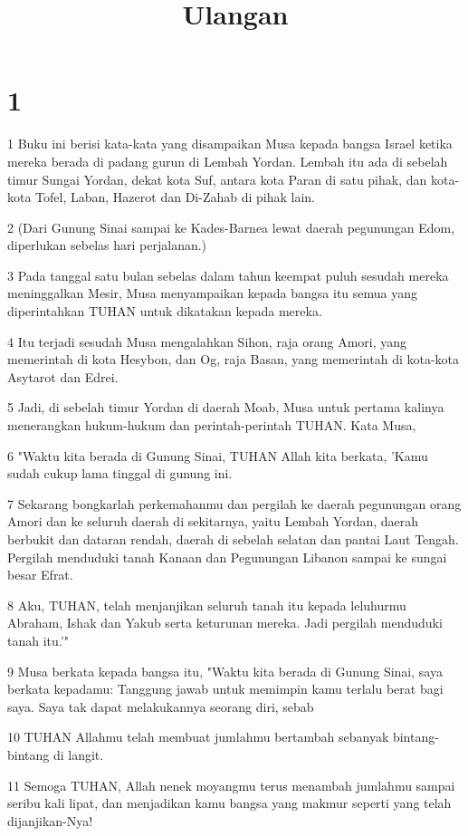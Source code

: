 

\title{Ulangan}


\chapter{1}

\par 1 Buku ini berisi kata-kata yang disampaikan Musa kepada bangsa Israel ketika mereka berada di padang gurun di Lembah Yordan. Lembah itu ada di sebelah timur Sungai Yordan, dekat kota Suf, antara kota Paran di satu pihak, dan kota-kota Tofel, Laban, Hazerot dan Di-Zahab di pihak lain.
\par 2 (Dari Gunung Sinai sampai ke Kades-Barnea lewat daerah pegunungan Edom, diperlukan sebelas hari perjalanan.)
\par 3 Pada tanggal satu bulan sebelas dalam tahun keempat puluh sesudah mereka meninggalkan Mesir, Musa menyampaikan kepada bangsa itu semua yang diperintahkan TUHAN untuk dikatakan kepada mereka.
\par 4 Itu terjadi sesudah Musa mengalahkan Sihon, raja orang Amori, yang memerintah di kota Hesybon, dan Og, raja Basan, yang memerintah di kota-kota Asytarot dan Edrei.
\par 5 Jadi, di sebelah timur Yordan di daerah Moab, Musa untuk pertama kalinya menerangkan hukum-hukum dan perintah-perintah TUHAN. Kata Musa,
\par 6 "Waktu kita berada di Gunung Sinai, TUHAN Allah kita berkata, 'Kamu sudah cukup lama tinggal di gunung ini.
\par 7 Sekarang bongkarlah perkemahanmu dan pergilah ke daerah pegunungan orang Amori dan ke seluruh daerah di sekitarnya, yaitu Lembah Yordan, daerah berbukit dan dataran rendah, daerah di sebelah selatan dan pantai Laut Tengah. Pergilah menduduki tanah Kanaan dan Pegunungan Libanon sampai ke sungai besar Efrat.
\par 8 Aku, TUHAN, telah menjanjikan seluruh tanah itu kepada leluhurmu Abraham, Ishak dan Yakub serta keturunan mereka. Jadi pergilah menduduki tanah itu.'"
\par 9 Musa berkata kepada bangsa itu, "Waktu kita berada di Gunung Sinai, saya berkata kepadamu: Tanggung jawab untuk memimpin kamu terlalu berat bagi saya. Saya tak dapat melakukannya seorang diri, sebab
\par 10 TUHAN Allahmu telah membuat jumlahmu bertambah sebanyak bintang-bintang di langit.
\par 11 Semoga TUHAN, Allah nenek moyangmu terus menambah jumlahmu sampai seribu kali lipat, dan menjadikan kamu bangsa yang makmur seperti yang telah dijanjikan-Nya!
